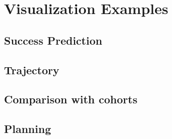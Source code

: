 \section{Visualization Examples}
\label{sec:examples}

\subsection{Success Prediction}
\label{subsec:success_prediction}

\subsection{Trajectory}
\label{subsec:trajectory}

\subsection{Comparison with cohorts}
\label{subsec:comparison}

\subsection{Planning}
\label{subsec:planning}
